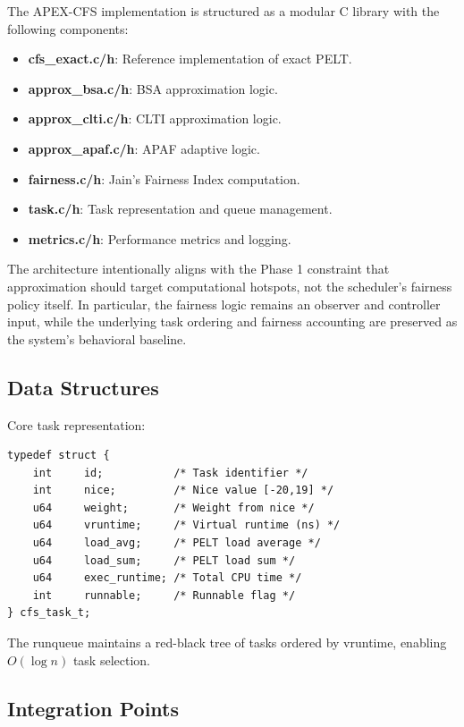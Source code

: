 \documentclass[conference]{IEEEtran}
\begin{document}
The APEX-CFS implementation is structured as a modular C library with the following components:

\begin{itemize}
\item \textbf{cfs\_exact.c/h}: Reference implementation of exact PELT.
\item \textbf{approx\_bsa.c/h}: BSA approximation logic.
\item \textbf{approx\_clti.c/h}: CLTI approximation logic.
\item \textbf{approx\_apaf.c/h}: APAF adaptive logic.
\item \textbf{fairness.c/h}: Jain's Fairness Index computation.
\item \textbf{task.c/h}: Task representation and queue management.
\item \textbf{metrics.c/h}: Performance metrics and logging.
\end{itemize}

The architecture intentionally aligns with the Phase 1 constraint that approximation should target computational hotspots, not the scheduler's fairness policy itself. In particular, the fairness logic remains an observer and controller input, while the underlying task ordering and fairness accounting are preserved as the system's behavioral baseline.

\subsection{Data Structures}

Core task representation:
\begin{lstlisting}
typedef struct {
    int     id;           /* Task identifier */
    int     nice;         /* Nice value [-20,19] */
    u64     weight;       /* Weight from nice */
    u64     vruntime;     /* Virtual runtime (ns) */
    u64     load_avg;     /* PELT load average */
    u64     load_sum;     /* PELT load sum */
    u64     exec_runtime; /* Total CPU time */
    int     runnable;     /* Runnable flag */
} cfs_task_t;
\end{lstlisting}

The runqueue maintains a red-black tree of tasks ordered by vruntime, enabling $O(\log n)$ task selection.

\subsection{Integration Points}
\end{document}
